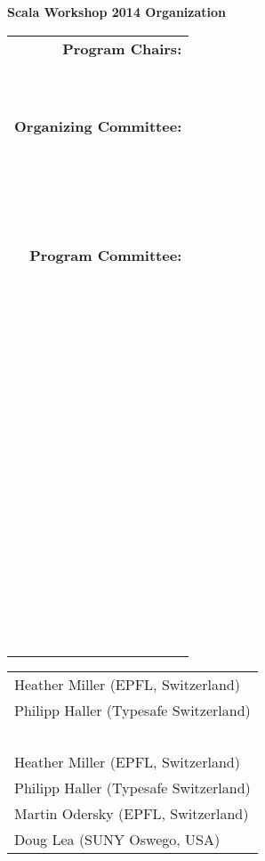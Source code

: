 \documentclass[10pt]{book}
\title{}
\date{}
\begin{document}
\thispagestyle{empty}


{\centering \LARGE \bf Scala Workshop 2014 Organization\par}

\vspace{0.5cm}

\begin{table}[ht]
\begin{minipage}[b]{0.35\linewidth}\centering
\begin{tabular}{r}
{\bf Program Chairs:}\\
~\\
~\\
{\bf Organizing Committee:}\\
~\\
~\\
~\\
~\\
{\bf Program Committee:}\\
~\\
~\\
~\\
~\\
~\\
~\\
~\\
~\\
~\\
~\\
~\\
~\\
~\\
~\\
~\\
\end{tabular}
\end{minipage}
\hspace{0.5cm}
\begin{minipage}[b]{0.55\linewidth}
\centering
\begin{tabular}{l}
Heather Miller (EPFL, Switzerland)\\
Philipp Haller (Typesafe Switzerland)\\
~\\
Heather Miller (EPFL, Switzerland)\\
Philipp Haller (Typesafe Switzerland)\\
Martin Odersky (EPFL, Switzerland)\\
Doug Lea (SUNY Oswego, USA)\\

\end{tabular}
\end{minipage}
\end{table}
\end{document}
